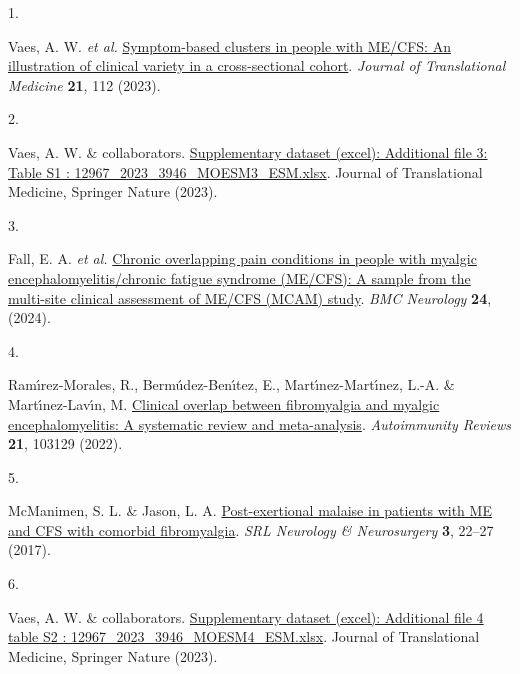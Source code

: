 \documentclass[
  letterpaper,
  DIV=11,
  numbers=noendperiod]{scrartcl}
\newlength{\cslhangindent}
\newlength{\csllabelwidth}
\newenvironment{CSLReferences}[2] %
 {\begin{list}{}{%
  \setlength{\itemindent}{0pt}
  \setlength{\leftmargin}{0pt}
  \setlength{\parsep}{0pt}
  \ifodd #1
   \setlength{\leftmargin}{\cslhangindent}
   \setlength{\itemindent}{-1\cslhangindent}
  \fi
  \setlength{\itemsep}{#2\baselineskip}}}
 {\end{list}}
\newcommand{\CSLLeftMargin}[1]{\parbox[t]{\csllabelwidth}{\strut#1\strut}}
\newcommand{\CSLRightInline}[1]{\parbox[t]{\linewidth - \csllabelwidth}{\strut#1\strut}}
\begin{document}
\label{refs}
\begin{CSLReferences}{0}{0}
\CSLLeftMargin{1. }%
\CSLRightInline{Vaes, A. W. \emph{et al.}
\href{https://doi.org/10.1186/s12967-023-03946-6}{Symptom-based clusters
in people with ME/CFS: An illustration of clinical variety in a
cross-sectional cohort}. \emph{Journal of Translational Medicine}
\textbf{21}, 112 (2023).}

\CSLLeftMargin{2. }%
\CSLRightInline{Vaes, A. W. \& collaborators.
\href{https://static-content.springer.com/esm/art\%3A10.1186\%2Fs12967-023-03946-6/MediaObjects/12967_2023_3946_MOESM3_ESM.xlsx}{Supplementary
dataset (excel): Additional file 3: Table S1 :
12967\_2023\_3946\_MOESM3\_ESM.xlsx}. Journal of Translational Medicine,
Springer Nature (2023).}

\CSLLeftMargin{3. }%
\CSLRightInline{Fall, E. A. \emph{et al.}
\href{https://doi.org/10.1186/s12883-024-03872-0}{Chronic overlapping
pain conditions in people with myalgic encephalomyelitis/chronic fatigue
syndrome (ME/CFS): A sample from the multi-site clinical assessment of
ME/CFS (MCAM) study}. \emph{BMC Neurology} \textbf{24}, (2024).}

\CSLLeftMargin{4. }%
\CSLRightInline{Ramı́rez-Morales, R., Bermúdez-Benı́tez, E.,
Martı́nez-Martı́nez, L.-A. \& Martı́nez-Lavı́n, M.
\href{https://doi.org/10.1016/j.autrev.2022.103129}{Clinical overlap
between fibromyalgia and myalgic encephalomyelitis: A systematic review
and meta-analysis}. \emph{Autoimmunity Reviews} \textbf{21}, 103129
(2022).}

\CSLLeftMargin{5. }%
\CSLRightInline{McManimen, S. L. \& Jason, L. A.
\href{https://www.ncbi.nlm.nih.gov/pmc/articles/PMC5464757}{Post-exertional
malaise in patients with ME and CFS with comorbid fibromyalgia}.
\emph{SRL Neurology \& Neurosurgery} \textbf{3}, 22--27 (2017).}

\CSLLeftMargin{6. }%
\CSLRightInline{Vaes, A. W. \& collaborators.
\href{https://static-content.springer.com/esm/art\%3A10.1186\%2Fs12967-023-03946-6/MediaObjects/12967_2023_3946_MOESM4_ESM.xlsx}{Supplementary
dataset (excel): Additional file 4 table S2 :
12967\_2023\_3946\_MOESM4\_ESM.xlsx}. Journal of Translational Medicine,
Springer Nature (2023).}

\end{CSLReferences}
\end{document}
